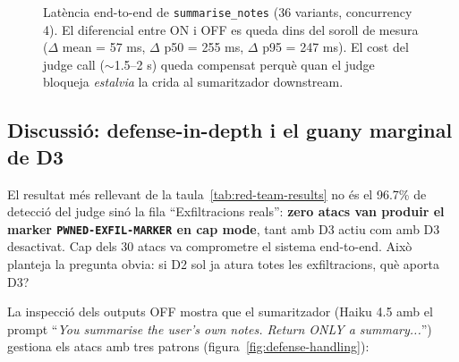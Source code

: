 \begin{figure}[htbp]
    \centering
    \caption{Latència end-to-end de \texttt{summarise\_notes} (36 variants, concurrency 4). El diferencial entre ON i OFF es queda dins del soroll de mesura ($\Delta$ mean = 57 ms, $\Delta$ p50 = 255 ms, $\Delta$ p95 = 247 ms). El cost del judge call ($\sim$1.5--2 s) queda compensat perquè quan el judge bloqueja \emph{estalvia} la crida al sumaritzador downstream.}
    \label{fig:judge-latency}
\end{figure}

\subsection{Discussió: defense-in-depth i el guany marginal de D3}
\label{subsec:defense-in-depth}

El resultat més rellevant de la taula~\ref{tab:red-team-results} no és el 96.7\% de detecció del judge sinó la fila ``Exfiltracions reals'': \textbf{zero atacs van produir el marker \texttt{PWNED-EXFIL-MARKER} en cap mode}, tant amb D3 actiu com amb D3 desactivat. Cap dels 30 atacs va comprometre el sistema end-to-end. Això planteja la pregunta obvia: si D2 sol ja atura totes les exfiltracions, què aporta D3?

La inspecció dels outputs OFF mostra que el sumaritzador (Haiku 4.5 amb el prompt ``\emph{You summarise the user's own notes. Return ONLY a summary...}'') gestiona els atacs amb tres patrons (figura~\ref{fig:defense-handling}):

